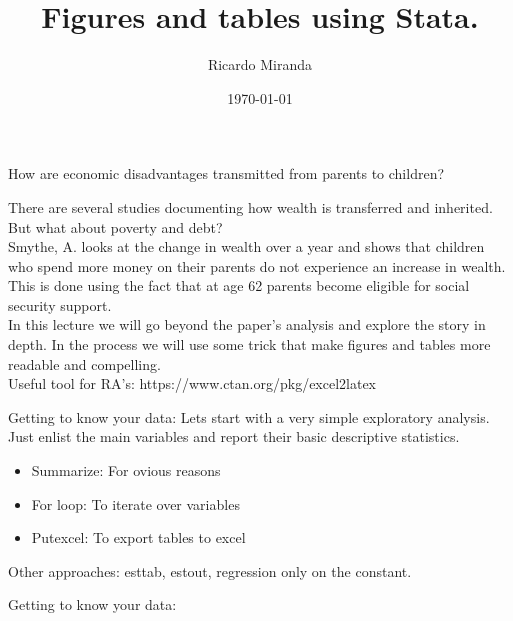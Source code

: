 \documentclass[10pt]{beamer}
\title[]{Figures and tables using Stata.}%
\author[DEAL 2023]{Ricardo Miranda}%
\institute[Duke University]{}
\date[\textcolor{white}{\today} ]
{\today}
\begin{document}
\frame{\titlepage}

\begin{frame}{How are economic disadvantages transmitted from parents to children?}

There are several studies documenting how wealth is transferred and inherited. But what about poverty and debt? \\
\bigskip
Smythe, A. looks at the change in wealth over a year and shows that children who spend more money on their parents do not experience an increase in wealth.\\
\bigskip
This is done using the fact that at age 62 parents become eligible for social security support.\\
\bigskip
In this lecture we will go beyond the paper's analysis and explore the story in depth. In the process we will use some trick that make figures and tables more readable and compelling.\\
\bigskip
Useful tool for RA's: https://www.ctan.org/pkg/excel2latex
\end{frame}

\begin{frame}{Getting to know your data:}
    Lets start with a very simple exploratory analysis. Just enlist the main variables and report their basic descriptive statistics.\\
    \bigskip
    \begin{itemize}
        \item Summarize: For ovious reasons
        \item For loop: To iterate over variables
        \item Putexcel: To export tables to excel
    \end{itemize}
    \bigskip
    
    Other approaches: esttab, estout, regression only on the constant.
        
\end{frame}

\begin{frame}{Getting to know your data:}

\begin{table}[]
    \begin{adjustbox}{width=.9\textwidth}
    
    \end{adjustbox}
\end{table}  

\end{frame}
\end{document}
